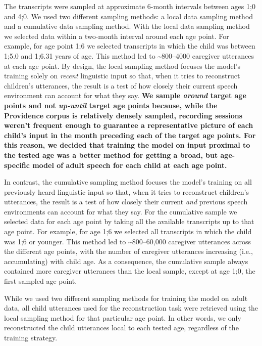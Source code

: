 \documentclass[man,mask,floatsintext]{apa6}
\begin{document}
The transcripts were sampled at approximate 6-month intervals between
ages 1;0 and 4;0. We used two different sampling methods: a local data
sampling method and a cumulative data sampling method. With the local
data sampling method we selected data within a two-month interval around
each age point. For example, for age point 1;6 we selected transcripts
in which the child was between 1;5.0 and 1;6.31 years of age. This
method led to \textasciitilde{}800--4000 caregiver utterances at each
age point. By design, the local sampling method focuses the model's
training solely on \emph{recent} linguistic input so that, when it tries
to reconstruct children's utterances, the result is a test of how
closely their current speech environment can account for what they say.
\textbf{We sample \emph{around} target age points and not
\emph{up-until} target age points because, while the Providence corpus
is relatively densely sampled, recording sessions weren't frequent
enough to guarantee a representative picture of each child's input in
the month preceding each of the target age points. For this reason, we
decided that training the model on input proximal to the tested age was
a better method for getting a broad, but age-specific model of adult
speech for each child at each age point.}

In contrast, the cumulative sampling method focuses the model's training
on all previously heard linguistic input so that, when it tries to
reconstruct children's utterances, the result is a test of how closely
their current \emph{and} previous speech environments can account for
what they say. For the cumulative sample we selected data for each age
point by taking all the available transcripts up to that age point. For
example, for age 1;6 we selected all transcripts in which the child was
1;6 or younger. This method led to \textasciitilde{}800--60,000
caregiver utterances across the different age points, with the number of
caregiver utterances increasing (i.e., accumulating) with child age. As
a consequence, the cumulative sample always contained more caregiver
utterances than the local sample, except at age 1;0, the first sampled
age point.

While we used two different sampling methods for training the model on
adult data, all child utterances used for the reconstruction task were
retrieved using the local sampling method for that particular age point.
In other words, we only reconstructed the child utterances local to each
tested age, regardless of the training strategy.
\end{document}
